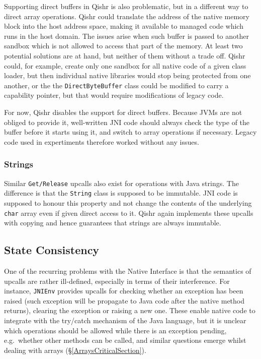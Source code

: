 \documentclass[a4paper,12pt,twoside,openright]{report}
\newcommand{\class}[1]{\texttt{#1}}
\begin{document}
Supporting direct buffers in Qishr is also problematic, but in a different way to direct array operations. Qishr could translate the address of the native memory block into the host address space, making it available to managed code which runs in the host domain. The issues arise when such buffer is passed to another sandbox which is not allowed to access that part of the memory. At least two potential solutions are at hand, but neither of them without a trade off. Qishr could, for example, create only one sandbox for all native code of a given class loader, but then individual native libraries would stop being protected from one another, or the the \class{DirectByteBuffer} class could be modified to carry a capability pointer, but that would require modifications of legacy code.

For now, Qishr disables the support for direct buffers. Because JVMs are not obliged to provide it, well-written JNI code should always check the type of the buffer before it starts using it, and switch to array operations if necessary. Legacy code used in expertiments therefore worked without any issues.

\subsubsection{Strings}

Similar \texttt{Get/Release} upcalls also exist for operations with Java strings. The difference is that the \class{String} class is supposed to be immutable. JNI code is supposed to honour this property and not change the contents of the underlying \class{char} array even if given direct access to it. Qishr again implements these upcalls with copying and hence guarantees that strings are always immutable.

\subsection{State Consistency}

One of the recurring problems with the Native Interface is that the semantics of upcalls are rather ill-defined, especially in terms of their interference. For instance, \texttt{JNIEnv} provides upcalls for checking whether an exception has been raised (such exception will be propagate to Java code after the native method returns), clearing the exception or raising a new one. These enable native code to integrate with the try/catch mechanism of the Java language, but it is unclear which operations should be allowed while there is an exception pending, e.g.\ whether other methods can be called, and similar questions emerge whilst dealing with arrays (\S\ref{ArraysCriticalSection}). 
\end{document}
